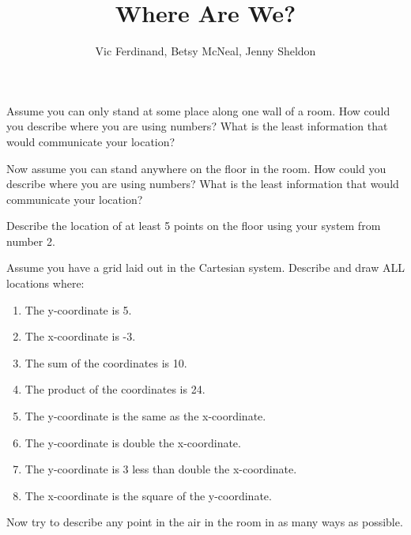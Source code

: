 \documentclass[nooutcomes]{ximera}
\title{Where Are We?}
\author{Vic Ferdinand, Betsy McNeal, Jenny Sheldon}
\begin{document}
\begin{abstract}\end{abstract}
\maketitle


\begin{problem}
Assume you can only stand at some place along one wall of a room.  How could you describe where you are using numbers?  What is the least information that would communicate your location?

\end{problem}

\begin{problem}
Now assume you can stand anywhere on the floor in the room.  How could you describe where you are using numbers?  What is the least information that would communicate your location?


\end{problem}



\begin{problem}
Describe the location of at least 5 points on the floor using your system from number 2.
\end{problem}


\begin{problem}\label{WhereAreWe4}
Assume you have a grid laid out in the Cartesian system.  Describe and draw ALL locations where:
\begin{enumerate}
\item The y-coordinate is 5.
\item The x-coordinate is -3.
\item The sum of the coordinates is 10.
\item The product of the coordinates is 24.
\item The y-coordinate is the same as the x-coordinate.
\item The y-coordinate is double the x-coordinate.
\item The y-coordinate is 3 less than double the x-coordinate.
\item The x-coordinate is the square of the y-coordinate.
\end{enumerate}

\end{problem}

\begin{problem}
Now try to describe any point in the air in the room in as many ways as possible.
\end{problem}
\end{document}
